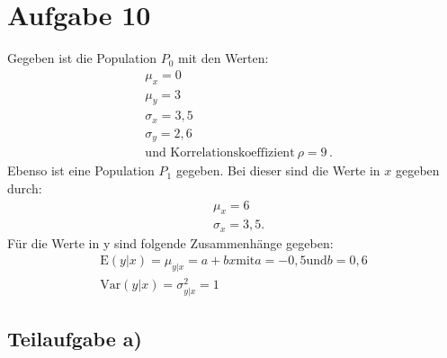 \section{Aufgabe 10}
Gegeben ist die Population $P_0$ mit den Werten:
\begin{align}
  &\mu_x = 0 \\
  &\mu_y = 3 \\
  &\sigma_x = 3{,}5 \\
  &\sigma_y = 2{,}6 \\
  &\text{und Korrelationskoeffizient}\: \rho=9\,.
\end{align}
Ebenso ist eine Population $P_1$ gegeben. Bei dieser sind die Werte in $x$ gegeben durch:
\begin{align}
  &\mu_x = 6 \\
  &\sigma_x = 3{,}5 \text{.}
\end{align}
Für die Werte in y sind folgende Zusammenhänge gegeben:
\begin{align}
  \text{E}(y\lvert x) = \mu_{y\lvert x} = a + bx \text{mit} a  = -0{,}5 \text{und} b=0{,}6 \label{eqn:Exy0} \\
  \text{Var}(y\lvert x) = \sigma_{y\lvert x}^2 = 1
\end{align}


\subsection{Teilaufgabe a)}
